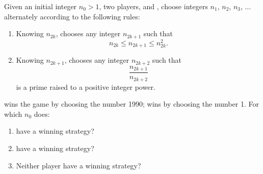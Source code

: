 Given an initial integer $ n_0 > 1$,  two players,  and ,  choose integers $ n_1$,  $ n_2$,  $ n_3$,  $ \ldots$ alternately according to the following rules:

\begin{enumerate}[label = (\roman*)]
	\item Knowing $ n_{2k}$,   chooses any integer $ n_{2k + 1}$ such that\[ n_{2k} \leq n_{2k + 1} \leq n_{2k}^2.\]

	\item Knowing $ n_{2k + 1}$,   chooses any integer $ n_{2k + 2}$ such that \[ \frac {n_{2k + 1}}{n_{2k + 2}}\] is a prime raised to a positive integer power.
\end{enumerate}

 wins the game by choosing the number 1990;  wins by choosing the number 1.  For which $ n_0$ does:

\begin{enumerate}[label = (\alph*)]
	\item {} have a winning strategy?
	\item {} have a winning strategy?
	\item Neither player have a winning strategy?
\end{enumerate}
